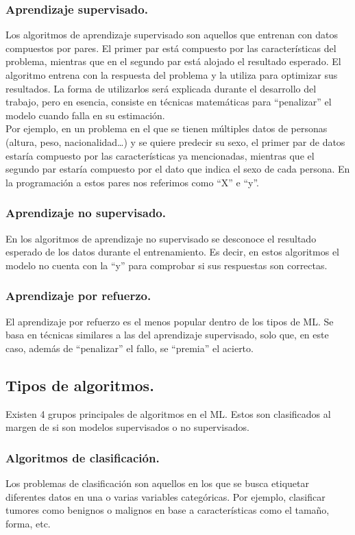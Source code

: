 \documentclass[a4paper,11pt]{article}
\begin{document}
\subsubsection{Aprendizaje supervisado.}
Los algoritmos de aprendizaje supervisado son aquellos que entrenan con datos compuestos por pares. El primer par está compuesto por las características del problema, mientras que en el segundo par está alojado el resultado esperado. El algoritmo entrena con la respuesta del problema y la utiliza para optimizar sus resultados. La forma de utilizarlos será explicada durante el desarrollo del trabajo, pero en esencia, consiste en técnicas matemáticas para “penalizar” el modelo cuando falla en su estimación.\\

\noindent
Por ejemplo, en un problema en el que se tienen múltiples datos de personas (altura, peso, nacionalidad…) y se quiere predecir su sexo, el primer par de datos estaría compuesto por las características ya mencionadas, mientras que el segundo par estaría compuesto por el dato que indica el sexo de cada persona. En la programación a estos pares nos referimos como “X” e “y”.

\subsubsection{Aprendizaje no supervisado.}
En los algoritmos de aprendizaje no supervisado se desconoce el resultado esperado de los datos durante el entrenamiento. Es decir, en estos algoritmos el modelo no cuenta con la “y” para comprobar si sus respuestas son correctas.
\subsubsection{Aprendizaje por refuerzo.}
El aprendizaje por refuerzo es el menos popular dentro de los tipos de ML. Se basa en técnicas similares a las del aprendizaje supervisado, solo que, en este caso, además de “penalizar” el fallo, se “premia” el acierto.
\subsection{Tipos de algoritmos.}
Existen 4 grupos principales de algoritmos en el ML. Estos son clasificados al margen de si son modelos supervisados o no supervisados.

\subsubsection{Algoritmos de clasificación.}
Los problemas de clasificación son aquellos en los que se busca etiquetar diferentes datos en una o varias variables categóricas. 
Por ejemplo, clasificar tumores como benignos o malignos en base a características como el tamaño, forma, etc.\\
\end{document}
